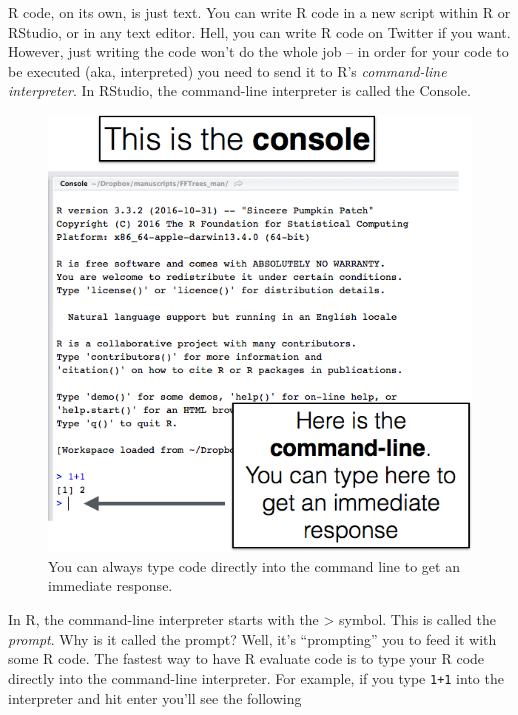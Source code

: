 \documentclass[]{book}
\theoremstyle{definition}
\theoremstyle{definition}
\theoremstyle{remark}
\begin{document}
R code, on its own, is just text. You can write R code in a new script
within R or RStudio, or in any text editor. Hell, you can write R code
on Twitter if you want. However, just writing the code won't do the
whole job -- in order for your code to be executed (aka, interpreted)
you need to send it to R's \textit{command-line interpreter}. In
RStudio, the command-line interpreter is called the Console.

\begin{figure}

{\centering \includegraphics[width=600px]{images/commandline} 

}

\caption{You can always type code directly into the command line to get an immediate response.}\label{fig:unnamed-chunk-37}
\end{figure}

In R, the command-line interpreter starts with the \textgreater{}
symbol. This is called the \textit{prompt}. Why is it called the prompt?
Well, it's ``prompting'' you to feed it with some R code. The fastest
way to have R evaluate code is to type your R code directly into the
command-line interpreter. For example, if you type \texttt{1+1} into the
interpreter and hit enter you'll see the following
\end{document}
